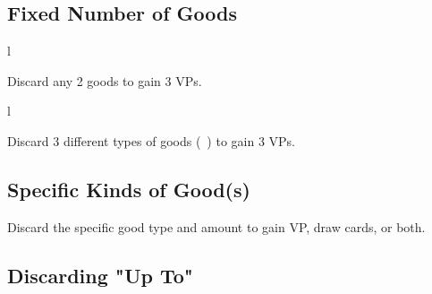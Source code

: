 \documentclass[letterpaper,landscape,twocolumn,8pt]{extarticle}
\newcommand{\inline}[1]{\scalerel*{#1}{M}}
\begin{document}
\begin{minipage}[t]{\calc{1/3}\columnwidth}
\setlength{\intextsep}{0pt}%

\subsection*{Fixed Number of Goods}
\begin{wrapfigure}{l}{\columnwidth}
    
\end{wrapfigure}

Discard any 2 goods to gain 3 VPs.

\begin{wrapfigure}{l}{\columnwidth}
    
\end{wrapfigure}

Discard 3 different types of goods
\mbox{(\inline{}
\inline{}
\inline{}
\inline{})} to gain 3 VPs.
\subsection*{\RaggedRight{}Specific Kinds of Good(s)}






Discard the specific good type and amount to gain VP, draw cards, or both.
\subsection*{Discarding "Up To"}




\end{minipage}
\end{document}
